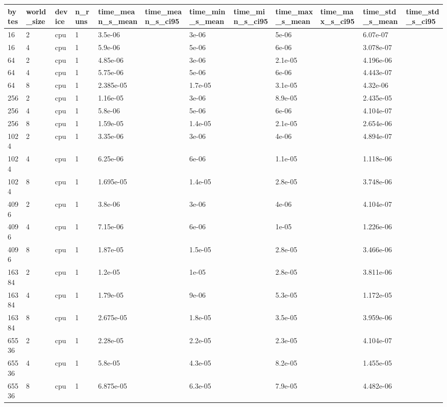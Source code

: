 \begin{tabular}{llllllllllll}
\hline
bytes & world\_size & device & n\_runs & time\_mean\_s\_mean & time\_mean\_s\_ci95 & time\_min\_s\_mean & time\_min\_s\_ci95 & time\_max\_s\_mean & time\_max\_s\_ci95 & time\_std\_s\_mean & time\_std\_s\_ci95 \\
\hline
16 & 2 & cpu & 1 & 3.5e-06 &  & 3e-06 &  & 5e-06 &  & 6.07e-07 &  \\
16 & 4 & cpu & 1 & 5.9e-06 &  & 5e-06 &  & 6e-06 &  & 3.078e-07 &  \\
64 & 2 & cpu & 1 & 4.85e-06 &  & 3e-06 &  & 2.1e-05 &  & 4.196e-06 &  \\
64 & 4 & cpu & 1 & 5.75e-06 &  & 5e-06 &  & 6e-06 &  & 4.443e-07 &  \\
64 & 8 & cpu & 1 & 2.385e-05 &  & 1.7e-05 &  & 3.1e-05 &  & 4.32e-06 &  \\
256 & 2 & cpu & 1 & 1.16e-05 &  & 3e-06 &  & 8.9e-05 &  & 2.435e-05 &  \\
256 & 4 & cpu & 1 & 5.8e-06 &  & 5e-06 &  & 6e-06 &  & 4.104e-07 &  \\
256 & 8 & cpu & 1 & 1.59e-05 &  & 1.4e-05 &  & 2.1e-05 &  & 2.654e-06 &  \\
1024 & 2 & cpu & 1 & 3.35e-06 &  & 3e-06 &  & 4e-06 &  & 4.894e-07 &  \\
1024 & 4 & cpu & 1 & 6.25e-06 &  & 6e-06 &  & 1.1e-05 &  & 1.118e-06 &  \\
1024 & 8 & cpu & 1 & 1.695e-05 &  & 1.4e-05 &  & 2.8e-05 &  & 3.748e-06 &  \\
4096 & 2 & cpu & 1 & 3.8e-06 &  & 3e-06 &  & 4e-06 &  & 4.104e-07 &  \\
4096 & 4 & cpu & 1 & 7.15e-06 &  & 6e-06 &  & 1e-05 &  & 1.226e-06 &  \\
4096 & 8 & cpu & 1 & 1.87e-05 &  & 1.5e-05 &  & 2.8e-05 &  & 3.466e-06 &  \\
16384 & 2 & cpu & 1 & 1.2e-05 &  & 1e-05 &  & 2.8e-05 &  & 3.811e-06 &  \\
16384 & 4 & cpu & 1 & 1.79e-05 &  & 9e-06 &  & 5.3e-05 &  & 1.172e-05 &  \\
16384 & 8 & cpu & 1 & 2.675e-05 &  & 1.8e-05 &  & 3.5e-05 &  & 3.959e-06 &  \\
65536 & 2 & cpu & 1 & 2.28e-05 &  & 2.2e-05 &  & 2.3e-05 &  & 4.104e-07 &  \\
65536 & 4 & cpu & 1 & 5.8e-05 &  & 4.3e-05 &  & 8.2e-05 &  & 1.455e-05 &  \\
65536 & 8 & cpu & 1 & 6.875e-05 &  & 6.3e-05 &  & 7.9e-05 &  & 4.482e-06 &  \\

\end{tabular}
